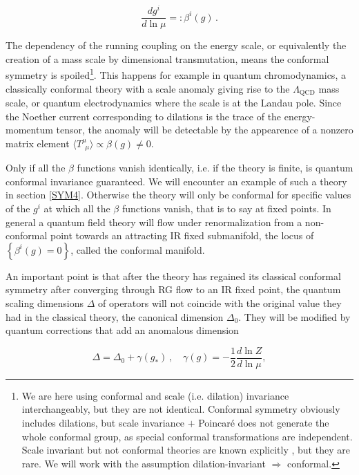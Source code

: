 \begin{equation}
	\frac{dg^i}{d\ln\mu} =: \beta^i(g)\,.
	\label{}
\end{equation}

The dependency of the running coupling on the energy scale, or equivalently the creation of a mass scale by dimensional transmutation, means the conformal symmetry is spoiled\footnote{We are here using conformal and scale (i.e. dilation) invariance interchangeably, but they are not identical. Conformal symmetry obviously includes dilations, but scale invariance $+$ Poincar\'e does not generate the whole conformal group, as special conformal transformations are independent. Scale invariant but not conformal theories are known explicitly \cite{scalebutnotconf}, but they are rare. We will work with the assumption dilation-invariant $\Rightarrow$ conformal.}. This happens for example in quantum chromodynamics, a classically conformal theory with a scale anomaly giving rise to the $\Lambda_\text{QCD}$ mass scale, or quantum electrodynamics where the scale is at the Landau pole. Since the Noether current corresponding to dilations is the trace of the energy-momentum tensor, the anomaly will be detectable by the appearence of a nonzero matrix element $\langle T^{\mu}_{\;\,\mu} \rangle \propto \beta(g) \neq 0$.

Only if all the $\beta$ functions vanish identically, i.e. if the theory is finite, is quantum conformal invariance guaranteed. We will encounter an example of such a theory in section \ref{SYM4}. Otherwise the theory will only be conformal for specific values of the $g^i$ at which all the $\beta$ functions vanish, that is to say at fixed points. In general a quantum field theory will flow under renormalization from a non-conformal point towards an attracting IR fixed submanifold, the locus of $\left\{ \beta^i(g) = 0 \right\}$, called the conformal manifold.

An important point is that after the theory has regained its classical conformal symmetry after converging through RG flow to an IR fixed point, the quantum scaling dimensions $\Delta$ of operators will not coincide with the original value they had in the classical theory, the canonical dimension $\Delta_0$. They will be modified by quantum corrections that add an anomalous dimension

\begin{equation}
	\Delta = \Delta_0 + \gamma(g_*)\,,\quad \gamma(g) = - \frac{1}{2}\frac{d \ln Z}{d \ln\mu},
	\label{}
\end{equation}

